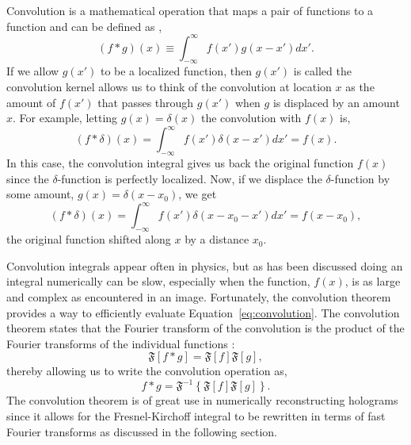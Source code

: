             Convolution is a mathematical operation that maps a pair of
            functions to a function and can be defined as \cite{DanielSteck},
            \begin{equation}
                (f*g)(x) \equiv \int_{-\infty}^{\infty} f(x')g(x-x')dx' .
                \label{eq:convolution}
            \end{equation}
            If we allow $g(x')$ to be a localized function,
            then $g(x')$ is called the convolution kernel
            allows us to think of the convolution
            at location $x$ as the amount of $f(x')$ that passes
            through $g(x')$ when $g$ is displaced by an amount $x$. For example,
            letting $g(x) = \delta(x)$ the convolution with $f(x)$ is,
            \begin{equation}
                (f*\delta)(x)=\int_{-\infty}^{\infty}f(x')\delta(x-x')dx'=f(x).
            \end{equation}
            In this case, the convolution integral gives us back the original function $f(x)$
            since
            the $\delta$-function is perfectly localized.
            Now, if we displace the $\delta$-function by some amount, $g(x)=\delta(x-x_0)$,
            we get
            \begin{equation}
                (f*\delta)(x)=\int_{-\infty}^{\infty}f(x')\delta(x-x_0-x')dx'=f(x-x_0),
            \end{equation}
            the original function shifted along $x$ by a distance $x_0$.

            Convolution integrals appear often in physics, but as has been discussed doing an
            integral numerically can be slow, especially when the function, $f(x)$,
            is as large and complex as encountered in an image. 
            Fortunately, the convolution theorem provides a way to efficiently evaluate
            Equation~\ref{eq:convolution}. The convolution theorem states that the
            Fourier transform of the convolution is the product of the Fourier
            transforms of the individual functions \cite{DanielSteck}:
            \begin{equation}
                \mathfrak{F}\left[ f*g
                \right]=\mathfrak{F}[f]\mathfrak{F}[g] ,
            \end{equation}
            thereby allowing us to write the convolution operation as,
            \begin{equation}
                f*g = \mathfrak{F}^{-1}\left\{\mathfrak{F}[f]\mathfrak{F}[g]
            \right\}.
            \end{equation}
            The convolution theorem is of great use in numerically
            reconstructing holograms since it allows for the Fresnel-Kirchoff
            integral to be rewritten in terms of fast Fourier transforms as
            discussed in the following section.

